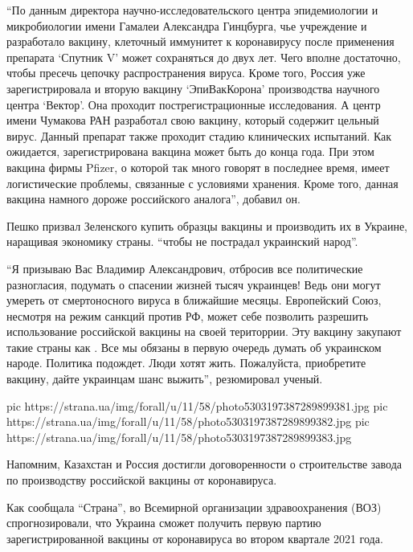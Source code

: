 \enquote{По данным директора научно-исследовательского центра эпидемиологии и
микробиологии имени Гамалеи Александра Гинцбурга, чье учреждение и разработало
вакцину, клеточный иммунитет к коронавирусу после применения препарата \enquote{Спутник
V} может сохраняться до двух лет. Чего вполне достаточно, чтобы пресечь цепочку
распространения вируса. Кроме того, Россия уже зарегистрировала и вторую
вакцину \dshM \enquote{ЭпиВакКорона} производства научного центра \enquote{Вектор}. Она проходит
пострегистрационные исследования. А центр имени Чумакова РАН разработал свою
вакцину, который содержит цельный вирус. Данный препарат также проходит стадию
клинических испытаний. Как ожидается, зарегистрирована вакцина может быть до
конца года. При этом вакцина фирмы Pfizer, о которой так много говорят в
последнее время, имеет логистические проблемы, связанные с условиями хранения.
Кроме того, данная вакцина намного дороже российского аналога}, \dshM добавил он. 

Пешко призвал Зеленского купить образцы вакцины и производить их в Украине,
наращивая экономику страны. \enquote{чтобы не пострадал украинский народ}.

\enquote{Я призываю Вас Владимир Александрович, отбросив все политические разногласия,
подумать о спасении жизней тысяч украинцев! Ведь они могут умереть от
смертоносного вируса в ближайшие месяцы. Европейский Союз, несмотря на режим
санкций против РФ, может себе позволить разрешить использование российской
вакцины на своей територрии. Эту вакцину закупают такие страны как . Все мы
обязаны в первую очередь думать об украинском народе. Политика подождет. Люди
хотят жить. Пожалуйста, приобретите вакцину, дайте украинцам шанс выжить}, \dshM резюмировал ученый. 

\ifcmt
pic https://strana.ua/img/forall/u/11/58/photo5303197387289899381.jpg
pic https://strana.ua/img/forall/u/11/58/photo5303197387289899382.jpg
pic https://strana.ua/img/forall/u/11/58/photo5303197387289899383.jpg
\fi

Напомним, Казахстан и Россия достигли договоренности о строительстве
завода по производству российской вакцины от коронавируса.

Как сообщала \enquote{Страна}, во Всемирной организации здравоохранения (ВОЗ)
спрогнозировали, что Украина сможет получить первую
партию зарегистрированной вакцины от коронавируса во втором квартале 2021
года.

